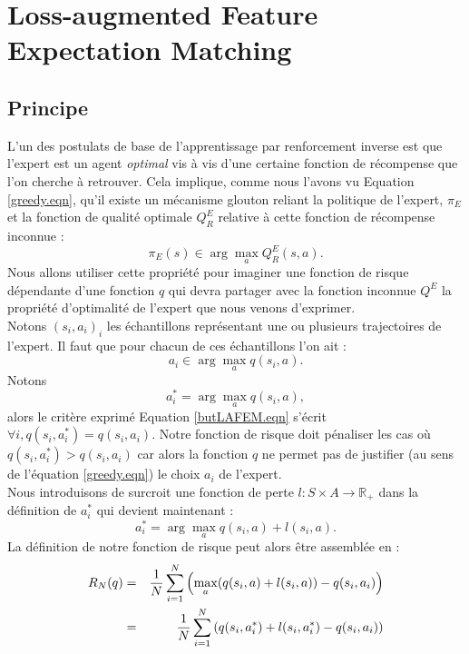 \documentclass[publibook-draft]{CAp2012}
\begin{document}
\section{Loss-augmented Feature Expectation Matching}
\subsection{Principe}
L'un des postulats de base de l'apprentissage par renforcement inverse est que l'expert est un agent \emph{optimal} vis à vis d'une certaine fonction de récompense que l'on cherche à retrouver. Cela implique, comme nous l'avons vu Equation \ref{greedy.eqn}, qu'il existe un mécanisme glouton reliant la politique de l'expert, $\pi_E$ et la fonction de qualité optimale $Q^E_R$ relative à cette fonction de récompense inconnue :
\begin{equation}
\pi_E(s) \in \arg\max_aQ^E_R(s,a).
\end{equation}
Nous allons utiliser cette propriété pour imaginer une fonction de risque dépendante d'une fonction $q$ qui devra partager avec la fonction inconnue $Q^E$ la propriété d'optimalité de l'expert que nous venons d'exprimer.\\
Notons $(s_i,a_i)_i$ les échantillons représentant une ou plusieurs trajectoires de l'expert. Il faut que pour chacun de ces échantillons l'on ait :
\begin{equation}
\label{butLAFEM.eqn}
a_i \in \arg\max_aq(s_i,a).
\end{equation}
Notons 
\begin{equation}
a^*_i = \arg\max_aq(s_i,a),
\end{equation}
alors le critère exprimé Equation \ref{butLAFEM.eqn} s'écrit $\forall i, q(s_i,a^*_i) = q(s_i,a_i)$. Notre fonction de risque doit pénaliser les cas où $q(s_i,a^*_i)>q(s_i,a_i)$ car alors la fonction $q$ ne permet pas de justifier (au sens de l'équation \ref{greedy.eqn}) le choix $a_i$ de l'expert.\\
Nous introduisons de surcroit une fonction de perte $l : S \times A \rightarrow \mathbb{R}_+$ dans la définition de $a^*_i$ qui devient maintenant :
\begin{equation}
\label{astar.def}
a^*_i = \arg\max_aq(s_i,a) + l(s_i,a).
\end{equation}
La définition de notre fonction de risque peut alors être assemblée en :
  \begin{eqnarray}
   R_N(q) &=& {1\over N} \sum_{i=1}^N\left(\max_{a}(q(s_i,a) + l(s_i,a)) - q(s_i,a_i) \right)\\
   &=& {1\over N} \sum_{i=1}^N\left(q(s_i,a_i^*) + l(s_i,a_i^*) - q(s_i,a_i) \right)
   \end{eqnarray}
\end{document}
